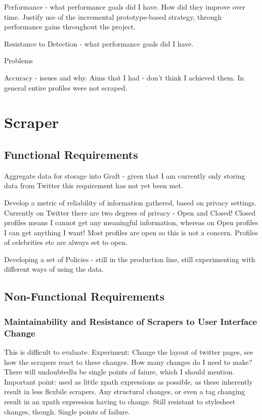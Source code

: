 Performance - what performance goals did I have. How did they improve over time. Justify use of the incremental prototype-based strategy, through performance gains throughout the project.

Resistance to Detection - what performance goals did I have.

Problems

Accuracy - issues and why. Aims that I had - don't think I achieved them. In general entire profiles were not scraped. 

\section{Scraper}

\subsection{Functional Requirements}

Aggregate data for storage into Graft - given that I am currently only storing data from Twitter this requirement has not yet been met.

Develop a metric of reliability of information gathered, based on privacy settings. Currently on Twitter there are two degrees of privacy - Open and Closed! Closed profiles means I cannot get any meaningful information, whereas on Open profiles I can get anything I want! Most profiles are open so this is not a concern. Profiles of celebrities etc are always set to open.

Developing a set of Policies - still in the production line, still experimenting with different ways of using the data.

\subsection{Non-Functional Requirements}

\subsubsection{Maintainability and Resistance of Scrapers to User Interface Change}
This is difficult to evaluate. Experiment: Change the layout of twitter pages, see how the scrapers react to these changes. How many changes do I need to make? There will undoubtedlu be single points of faiure, which I should mention. Important point: used as little xpath expressions as possible, as these inherently result in less flexbile scrapers. Any structural changes, or even a tag changing result in an xpath expression having to change. Still resistant to stylesheet changes, though.
Single points of failure.

